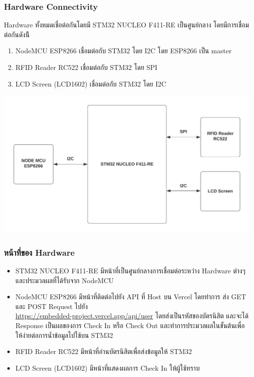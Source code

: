 \documentclass[fontsize=14pt]{extarticle}
\begin{document}
\subsubsection{Hardware Connectivity}
Hardware ทั้งหมดเชื่อต่อกันโดยมี STM32 NUCLEO F411-RE เป็นศูนย์กลาง โดยมีการเชื่อมต่อกันดังน้ี
\begin{enumerate}
    \item NodeMCU ESP8266 เชื่อมต่อกับ STM32 โดย I2C โดย ESP8266 เป็น master
    \item RFID Reader RC522 เชื่อมต่อกับ STM32 โดย SPI
    \item LCD Screen (LCD1602) เชื่อมต่อกับ STM32 โดย I2C
\end{enumerate}
\includegraphics[]{Diagram.png}
\subsubsection{หน้าที่ของ Hardware}
\begin{itemize}
    \item STM32 NUCLEO F411-RE มีหน้าที่เป็นศูนย์กลางการเชื่อมต่อระหว่าง Hardware ต่างๆ และประมวลผลที่ได้รับจาก NodeMCU
    \item NodeMCU ESP8266 มีหน้าที่ติดต่อไปยัง API ที่ Host บน Vercel  โดยทำการ ส่ง GET และ POST Request ไปยัง \\ \url{https://embedded-project.vercel.app/api/user}  โดยส่งเป็นรหัสของบัตรนิสิต และจะได้ Response เป็นผลของการ Check In หรือ Check Out และทำการประมวลผลในขั้นต้นเพื่อให้ง่ายต่อการน้ำข้อมูลไปใช้บน STM32
    \item RFID Reader RC522 มีหน้าที่อ่านบัตรนิสิตเพื่อส่งข้อมูลให้ STM32
    \item LCD Screen (LCD1602) มีหน้าที่แสดงผลการ Check In ให้ผู้ใช้ทราบ
\end{itemize}
\end{document}
